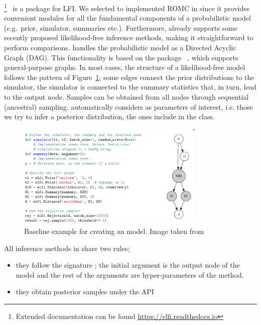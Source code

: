 \footnote{Extended
  documentation can be found
  \href{https://elfi.readthedocs.io/en/latest/}{https://elfi.readthedocs.io}}~\cite{1708.00707}
is a  package for LFI. We
selected to implemented ROMC in  since it provides
convenient modules for all the fundamental components of a
probabilistic model (e.g.\ prior, simulator, summaries
etc.). Furthermore,  already supports some recently proposed
likelihood-free inference methods, making it straightforward to
perform comparisons.
%
 handles the probabilistic model as a Directed Acyclic Graph
(DAG). This functionality is based on the package
~\cite{hagberg2008exploring}, which supports
general-purpose graphs. In most cases, the structure of a
likelihood-free model follows the pattern of Figure~\ref{fig:elfi};
some edges connect the prior distributions to the simulator, the
simulator is connected to the summary statistics that, in turn, lead
to the output node. Samples can be obtained from all nodes through
sequential (ancestral) sampling.  automatically considers as
parameters of interest, i.e. those we try to infer a posterior
distribution, the ones include in the 
class.

\begin{figure}[ht]
    \begin{center}
      \includegraphics[width=0.8\textwidth]{./latex_files/images/chapter2/elfi.png}
    \end{center}
    \caption[Baseline example for creating an  model]{Baseline example for creating an  model. Image taken from \cite{1708.00707}}
    \label{fig:elfi}
\end{figure}

All inference methods in  share two rules;

\begin{itemize}
\item they follow the signature ; the initial argument is the output node of the model and the rest
  of the arguments are hyper-parameters of the method.
\item they obtain posterior samples under the API 
\end{itemize}
